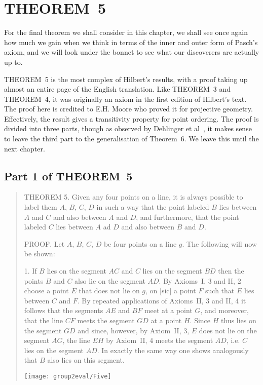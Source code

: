 \section{THEOREM~5}\label{sec:Theorem5}
For the final theorem we shall consider in this chapter, we shall see once again how much we gain when we think in terms of the inner and outer form of Pasch's axiom, and we will look under the bonnet to see what our discoverers are actually up to.

THEOREM~5 is the most complex of Hilbert's results, with a proof taking up almost an entire page of the English translation. Like THEOREM~3 and THEOREM~4, it was originally an axiom in the first edition of Hilbert's text. The proof here is credited to E.H. Moore who proved it for projective geometry. Effectively, the result gives a transitivity property for point ordering. The proof is divided into three parts, though as observed by Dehlinger et al~\cite{DehlingerFOG}, it makes sense to leave the third part to the generalisation of Theorem~6. We leave this until the next chapter.

\subsection{Part 1 of THEOREM~5}
\begin{quote}
THEOREM 5. Given any four points on a line, it is always possible to label them $A$, $B$, $C$, $D$ in such a way that the point labeled $B$ lies between $A$ and $C$ and also between $A$ and $D$, and furthermore, that the point labeled $C$ lies between $A$ ad $D$ and also between $B$ and $D$.

PROOF. Let $A$, $B$, $C$, $D$ be four points on a line $g$. The following will now be shown:

1. If $B$ lies on the segment $AC$ and $C$ lies on the segment $BD$ then the points $B$ and $C$ also lie on the segment $AD$. By Axioms~I, 3 and II, 2 choose a point $E$ that does not lie on $g$, on [sic] a point $F$ such that $E$ lies between $C$ and $F$. By repeated applications of Axioms~II, 3 and II, 4 it follows that the segments $AE$ and $BF$ meet at a point $G$, and moreover, that the line $CF$ meets the segment $GD$ at a point $H$. Since $H$ thus lies on the segment $GD$ and since, however, by Axiom~II, 3, $E$ does not lie on the segment $AG$, the line $EH$ by Axiom~II, 4 meets the segment $AD$, i.e. $C$ lies on the segment $AD$. In exactly the same way one shows analogously that $B$ also lies on this segment.

\centering\texttt{[image: group2eval/Five]}
\end{quote}

